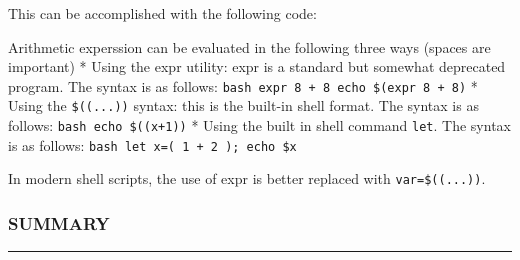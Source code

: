 This can be accomplished with the following code:

\begin{Shaded}
\begin{Highlighting}[]
 
 
 
 

\KeywordTok{if [}   \KeywordTok{ ]} \KeywordTok{&& [}   \KeywordTok{ ]} \NormalTok{; }
   
\KeywordTok{elif [}   \KeywordTok{ ]} \NormalTok{; }
   
\KeywordTok{elif [}   \KeywordTok{ ]} \NormalTok{; }
   
   
\end{Highlighting}
\end{Shaded}

Arithmetic experssion can be evaluated in the following three ways
(spaces are important) * Using the expr utility: expr is a standard but
somewhat deprecated program. The syntax is as follows:
\texttt{bash   expr 8 + 8   echo \$(expr 8 + 8)} * Using the
\texttt{\$((...))} syntax: this is the built-in shell format. The syntax
is as follows: \texttt{bash   echo \$((x+1))} * Using the built in shell
command \texttt{let}. The syntax is as follows:
\texttt{bash   let x=( 1 + 2 ); echo \$x}

In modern shell scripts, the use of expr is better replaced with
\texttt{var=\$((...))}.

\subsubsection{SUMMARY}\label{summary-13}

\begin{center}\rule{3in}{0.4pt}\end{center}

